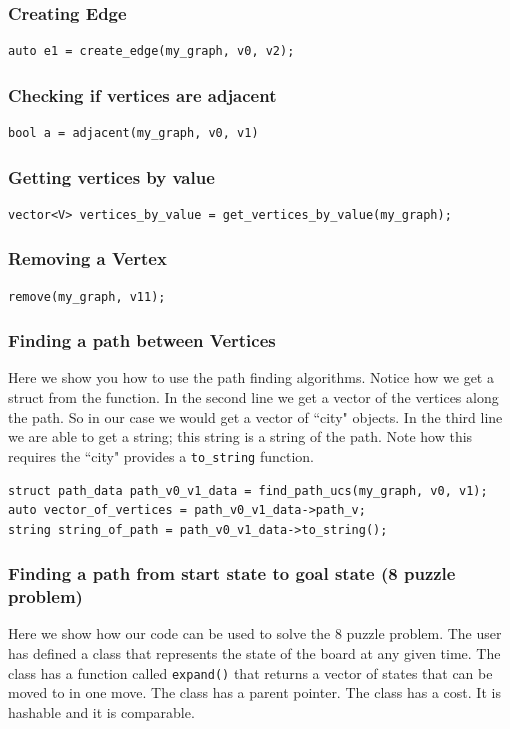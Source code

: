 \documentclass{article}
\begin{document}
\subsubsection{Creating Edge}
\begin{lstlisting}
auto e1 = create_edge(my_graph, v0, v2);
\end{lstlisting}

\subsubsection{Checking if vertices are adjacent}
\begin{lstlisting}
bool a = adjacent(my_graph, v0, v1)
\end{lstlisting}

\subsubsection{Getting vertices by value}
\begin{lstlisting}
vector<V> vertices_by_value = get_vertices_by_value(my_graph);
\end{lstlisting}

\subsubsection{Removing a Vertex}
\begin{lstlisting}
remove(my_graph, v11);
\end{lstlisting}

\subsubsection{Finding a path between Vertices}
Here we show you how to use the path finding algorithms. Notice how we get a struct from the function. In the second line we get a vector of the vertices along the path. So in our case we would get a vector of ``city" objects. In the third line we are able to get a string; this string is a string of the path. Note how this requires the ``city" provides a \texttt{to\_string} function.
\begin{lstlisting}
struct path_data path_v0_v1_data = find_path_ucs(my_graph, v0, v1);
auto vector_of_vertices = path_v0_v1_data->path_v;
string string_of_path = path_v0_v1_data->to_string();
\end{lstlisting}

\subsubsection{Finding a path from start state to goal state (8 puzzle problem)}
Here we show how our code can be used to solve the 8 puzzle problem. The user has defined a class that represents the state of the board at any given time. The class has a function called \texttt{expand()} that returns a vector of states that can be moved to in one move. The class has a parent pointer. The class has a cost. It is hashable and it is comparable. 
\end{document}
